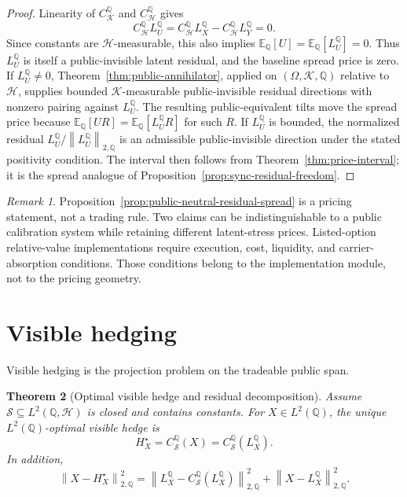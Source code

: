 \documentclass[11pt,a4paper]{amsart}
\theoremstyle{plain}
\newtheorem{theorem}{Theorem}[section]
\theoremstyle{definition}
\theoremstyle{remark}
\newtheorem{remark}[theorem]{Remark}
\newcommand{\QQ}{\mathbb{Q}}
\newcommand{\EE}{\mathbb{E}}
\newcommand{\cH}{\mathcal{H}}
\newcommand{\cK}{\mathcal{K}}
\newcommand{\cS}{\mathcal{S}}
\newcommand{\norm}[1]{\left\lVert #1\right\rVert}
\begin{document}
\begin{proof}
Linearity of \(C_{\cK}^{\QQ}\) and \(C_{\cH}^{\QQ}\) gives
\[
        C_{\cH}^{\QQ}L_U^\QQ
        =
        C_{\cH}^{\QQ}L_X^\QQ-C_{\cH}^{\QQ}L_Y^\QQ
        =
        0.
\]
Since constants are \(\cH\)-measurable, this also implies
\(\EE_\QQ[U]=\EE_\QQ[L_U^\QQ]=0\).  Thus \(L_U^\QQ\) is itself a public-invisible latent residual,
and the baseline spread price is zero.  If \(L_U^\QQ\ne0\), Theorem~\ref{thm:public-annihilator},
applied on \((\Omega,\cK,\QQ)\) relative to \(\cH\), supplies bounded \(\cK\)-measurable
public-invisible residual directions with nonzero pairing against \(L_U^\QQ\).  The resulting
public-equivalent tilts move the spread price because \(\EE_\QQ[UR]=\EE_\QQ[L_U^\QQ R]\) for such
\(R\).  If \(L_U^\QQ\) is bounded, the normalized residual
\(L_U^\QQ/\norm{L_U^\QQ}_{2,\QQ}\) is an admissible public-invisible direction under the stated
positivity condition.  The interval then follows from Theorem~\ref{thm:price-interval}; it is the
spread analogue of Proposition~\ref{prop:sync-residual-freedom}.
\end{proof}

\begin{remark}
Proposition~\ref{prop:public-neutral-residual-spread} is a pricing statement, not a trading rule.
Two claims can be indistinguishable to a public calibration system while retaining different
latent-stress prices.  Listed-option relative-value implementations require execution, cost,
liquidity, and carrier-absorption conditions.  Those conditions belong to the implementation module,
not to the pricing geometry.
\end{remark}

\section{Visible hedging}\label{sec:hedging}

Visible hedging is the projection problem on the tradeable public span.

\begin{theorem}[Optimal visible hedge and residual decomposition]\label{thm:visible-hedge}
Assume \(\cS\subseteq L^2(\QQ,\cH)\) is closed and contains constants.  For \(X\in L^2(\QQ)\), the
unique \(L^2(\QQ)\)-optimal visible hedge is
\[
        H_X^\star=C_{\cS}^{\QQ}(X)=C_{\cS}^{\QQ}(L_X^\QQ).
\]
In addition,
\[
        \norm{X-H_X^\star}_{2,\QQ}^2
        =
        \norm{L_X^\QQ-C_{\cS}^{\QQ}(L_X^\QQ)}_{2,\QQ}^2
        +
        \norm{X-L_X^\QQ}_{2,\QQ}^2.
\]
\end{theorem}
\end{document}
